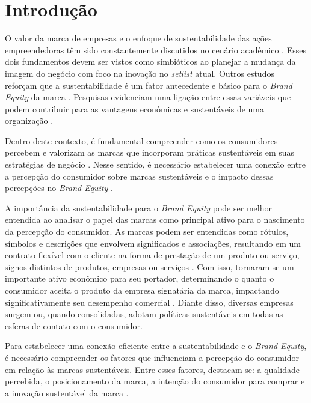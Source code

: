 \section{Introdução}

O valor da marca de empresas e o enfoque de sustentabilidade das ações empreendedoras têm sido constantemente discutidos no cenário acadêmico \cite{Moritz2018}. Esses dois fundamentos devem ser vistos como simbióticos ao planejar a mudança da imagem do negócio com foco na inovação no \textit{setlist} atual. Outros estudos reforçam que a sustentabilidade é um fator antecedente e básico para o \textit{Brand Equity} da marca \cite{Gonzalez-Lafaysse2016FacebookChain,Arrigo2017281,Ray2020AntecedentsSustainability}. Pesquisas evidenciam uma ligação entre essas variáveis que podem contribuir para as vantagens econômicas e sustentáveis de uma organização \cite{Marin-Garcia2020HowRetailing}. 

Dentro deste contexto, é fundamental compreender como os consumidores percebem e valorizam as marcas que incorporam práticas sustentáveis em suas estratégias de negócio \cite{Mehdikhani2022TheFactors}. Nesse sentido, é necessário estabelecer uma conexão entre a percepção do consumidor sobre marcas sustentáveis e o impacto dessas percepções no \textit{Brand Equity} \cite{Emari2012TheEquity}.

A importância da sustentabilidade para o \textit{Brand Equity} pode ser melhor entendida ao analisar o papel das marcas como principal ativo para o nascimento da percepção do consumidor. As marcas podem ser entendidas como rótulos, símbolos e descrições que envolvem significados e associações, resultando em um contrato flexível com o cliente na forma de prestação de um produto ou serviço, signos distintos de produtos, empresas ou serviços \cite{Woodrow2007}. Com isso, tornaram-se um importante ativo econômico para seu portador, determinando o quanto o consumidor aceita o produto da empresa signatária da marca, impactando significativamente seu desempenho comercial \cite{Singh2020CorporateAlliances}. Diante disso, diversas empresas surgem ou, quando consolidadas, adotam políticas sustentáveis em todas as esferas de contato com o consumidor.

Para estabelecer uma conexão eficiente entre a sustentabilidade e o \textit{Brand Equity}, é necessário compreender os fatores que influenciam a percepção do consumidor em relação às marcas sustentáveis. Entre esses fatores, destacam-se: a qualidade percebida, o posicionamento da marca, a intenção do consumidor para comprar e a inovação sustentável da marca \cite{Aaker1997DimensionsPersonality, Figueiredo2019PassengersBrazil}. 

